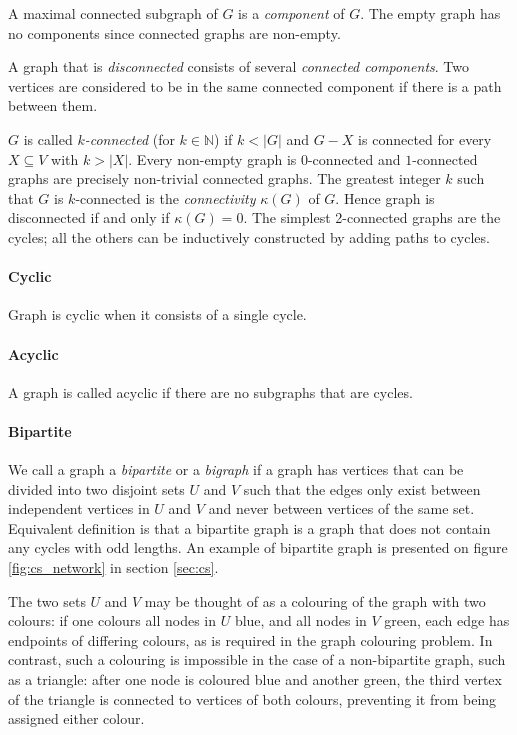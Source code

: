           A maximal connected subgraph of $G$ is a \emph{component} of $G$. The empty graph has no components since connected graphs are non-empty. 

          A graph that is \emph{disconnected} consists of several \emph{connected components}. Two vertices are considered to be in the same connected component if there is a path between them.

          $G$ is called $k$\emph{-connected} (for $k \in \mathbb{N}$) if $k < |G|$ and $G - X$ is connected for every $X \subseteq V$ with $k > |X|$. Every non-empty graph is $0$-connected and $1$-connected graphs are precisely non-trivial connected graphs. The greatest integer $k$ such that $G$ is $k$-connected is the \emph{connectivity} $\kappa(G)$ of $G$. Hence graph is disconnected if and only if $\kappa(G) = 0$. The simplest 2-connected graphs are the cycles; all the others can be inductively constructed by adding paths to cycles.

        \paragraph{Cyclic}
        
          Graph is cyclic when it consists of a single cycle.
          
        \paragraph{Acyclic}
        
          A graph is called acyclic if there are no subgraphs that are cycles.

        \paragraph{Bipartite}
        
          We call a graph a \emph{bipartite} or a \emph{bigraph} if a graph has vertices that can be divided into two disjoint sets $U$ and $V$ such that the edges only exist between independent vertices in $U$ and $V$ and never between vertices of the same set\cite{Diestel2012}. Equivalent definition is that a bipartite graph is a graph that does not contain any cycles with odd lengths\cite{AsratianDenleyHaggkvist1998}. An example of bipartite graph is presented on figure \ref{fig:cs_network} in section \ref{sec:cs}.

          The two sets $U$ and $V$ may be thought of as a colouring of the graph with two colours: if one colours all nodes in $U$ blue, and all nodes in $V$ green, each edge has endpoints of differing colours, as is required in the graph colouring problem\cite{AsratianDenleyHaggkvist1998,Scheinerman2012}. In contrast, such a colouring is impossible in the case of a non-bipartite graph, such as a triangle: after one node is coloured blue and another green, the third vertex of the triangle is connected to vertices of both colours, preventing it from being assigned either colour.
          
